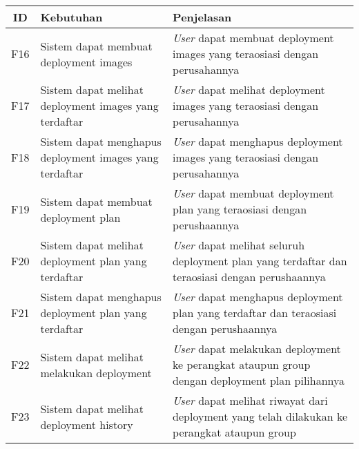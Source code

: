 \bgroup
\begin{table}[ht]
  \def\arraystretch{1.7}
  \centering
  \begin{tabular}{|c|p{4.5cm}|p{8cm}|}
    \hline
    ID  & Kebutuhan                                               & Penjelasan                                                                                            \\


    \hline
    F16 & Sistem dapat membuat deployment images                  & \textit{User} dapat membuat deployment images yang teraosiasi dengan perusahannya                     \\
    \hline
    F17 & Sistem dapat melihat deployment images yang terdaftar   & \textit{User} dapat melihat deployment images yang teraosiasi dengan perusahannya                     \\
    \hline
    F18 & Sistem dapat menghapus deployment images yang terdaftar & \textit{User} dapat menghapus deployment images yang teraosiasi dengan perusahannya                   \\
    \hline
    F19 & Sistem dapat membuat deployment plan                    & \textit{User} dapat membuat deployment plan yang teraosiasi dengan perushaannya                       \\
    \hline
    F20 & Sistem dapat melihat deployment plan yang terdaftar     & \textit{User} dapat melihat seluruh deployment plan yang terdaftar dan teraosiasi dengan perushaannya \\
    \hline
    F21 & Sistem dapat menghapus deployment plan yang terdaftar   & \textit{User} dapat menghapus deployment plan yang terdaftar dan teraosiasi dengan perushaannya       \\
    \hline
    F22 & Sistem dapat melihat melakukan deployment               & \textit{User} dapat melakukan deployment ke perangkat ataupun group dengan deployment plan pilihannya \\
    \hline
    F23 & Sistem dapat melihat  deployment history                & \textit{User} dapat melihat riwayat dari deployment yang telah dilakukan ke perangkat ataupun group   \\
    \hline
  \end{tabular}
\end{table}
\egroup

